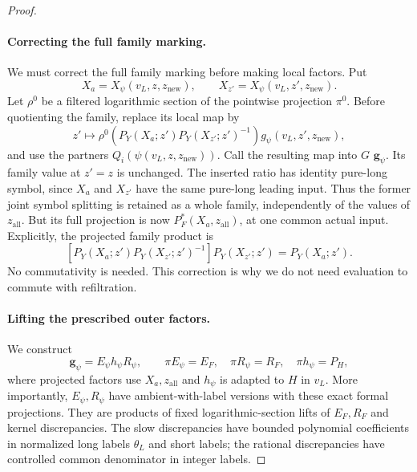 \begin{proof}
\paragraph{Correcting the full family marking.}

We must correct the full family marking before making local factors.
Put
\[
 X_a=X_\psi(v_L,z,z_{\mathrm{new}}),\qquad
 X_{z'}=X_\psi(v_L,z',z_{\mathrm{new}}).
\]
Let $\rho^0$ be a filtered logarithmic section of the pointwise
projection $\pi^0$.  Before quotienting the family, replace its
local map by
\begin{equation}
 z'\longmapsto
 \rho^0\!\left(P_Y(X_a;z')P_Y(X_{z'};z')^{-1}\right)
                  g_\psi(v_L,z',z_{\mathrm{new}}),
 \label{ap:active:common-site-correction}
\end{equation}
and use the partners $Q_i(\psi(v_L,z,z_{\mathrm{new}}))$.
Call the resulting map into $G$ $\mathbf g_\psi$.
Its family value at $z'=z$ is unchanged.  The inserted ratio has
identity pure-long symbol, since $X_a$ and $X_{z'}$ have the same
pure-long leading input.  Thus the former joint symbol splitting
is retained as a whole family, independently of the values of
$z_{\mathrm{all}}$.  But its full projection is now
$P_F^*(X_a,z_{\mathrm{all}})$, at one common actual input.  Explicitly,
the projected family product is
\[
 [P_Y(X_a;z')P_Y(X_{z'};z')^{-1}]P_Y(X_{z'};z')
                         =P_Y(X_a;z').
\]
No commutativity is needed.  This correction is why we do not need
evaluation to commute with refiltration.

\paragraph{Lifting the prescribed outer factors.}

We construct
\begin{equation}
 \mathbf g_\psi=E_\psi h_\psi R_\psi,
 \qquad \pi E_\psi=E_F,\quad
 \pi R_\psi=R_F,\quad \pi h_\psi=P_H,
 \label{ap:active:local-full-factors}
\end{equation}
where projected factors use $X_a,z_{\mathrm{all}}$ and $h_\psi$ is
adapted to $H$ in $v_L$.  More importantly, $E_\psi,R_\psi$ have
ambient-with-label versions with these exact formal projections.
They are products of fixed logarithmic-section lifts of $E_F,R_F$
and kernel discrepancies.  The slow discrepancies have bounded
polynomial coefficients in normalized long labels $\theta_L$ and
short labels; the rational discrepancies have controlled common
denominator in integer labels.


\end{proof}
